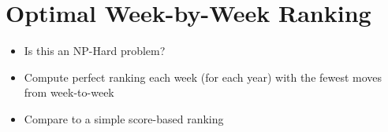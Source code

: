 \documentclass[11pt]{article}
\begin{document}
\section{Optimal Week-by-Week Ranking}

\begin{itemize}
\item Is this an NP-Hard problem?
\item Compute perfect ranking each week (for each year) with the fewest moves from week-to-week
\item Compare to a simple score-based ranking
\end{itemize}


\newpage




  
\end{document}
